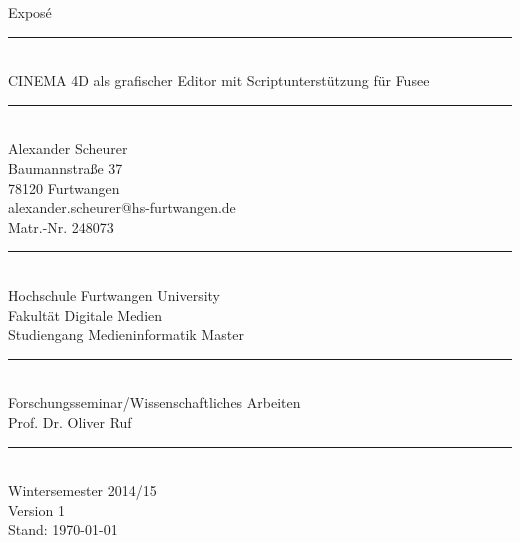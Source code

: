 \begin{titlepage}
\begin{center}

\Huge
Expos\'{e}\\[-8pt]
\noindent\rule{13.4cm}{0.4pt}\\
\huge
CINEMA 4D als grafischer Editor mit Scriptunterstützung für Fusee\\[-16pt]
\noindent\rule{13.4cm}{0.4pt}\\[24pt]

\normalsize
Alexander Scheurer\\
Baumannstraße 37\\
78120 Furtwangen\\[12pt]
alexander.scheurer@hs-furtwangen.de\\
Matr.-Nr. 248073\\[16pt]

\noindent\rule{9cm}{0.4pt}\\


\large
Hochschule Furtwangen University\\
Fakultät Digitale Medien\\
Studiengang Medieninformatik Master\\[-8pt]
\noindent\rule{9cm}{0.4pt}\\

Forschungsseminar/Wissenschaftliches Arbeiten\\
Prof. Dr. Oliver Ruf\\[-8pt]
\noindent\rule{9cm}{0.4pt}\\
Wintersemester 2014/15\\[60pt]


Version 1\\
Stand: \today

\end{center}
\end{titlepage}